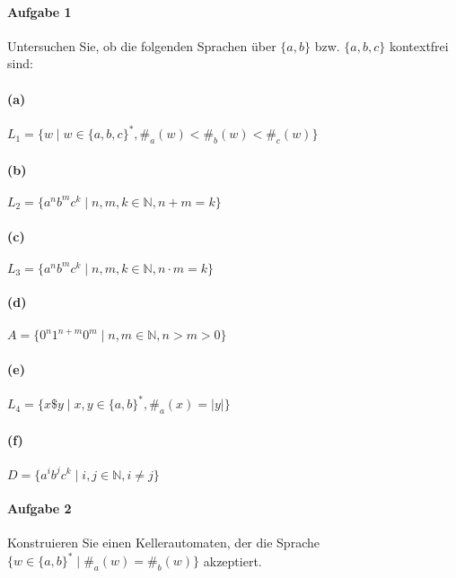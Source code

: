 \documentclass[titlepage]{article}
\renewcommand{\]}{\right]}
\renewcommand{\[}{\left[}
\renewcommand{\)}{\right)}
\renewcommand{\(}{\left(}
\renewcommand{\|}{\;|\;}
\begin{document}
\begingroup\let\clearpage\relax
	
	
	\paragraph{Aufgabe 1} Untersuchen Sie, ob die folgenden Sprachen über $\{a,b\}$ bzw. $\{a,b,c\}$ kontextfrei sind:
		\paragraph{(a)} $L_1=\{w\mid w\in\{a,b,c\}^*,\#_a(w)<\#_b(w)<\#_c(w)\}$
		
		\paragraph{(b)}  $L_2=\{a^nb^mc^k\mid n,m,k\in\mathbb{N},n+m=k\}$
		 
		\paragraph{(c)} $L_3=\{a^nb^mc^k\mid n,m,k\in\mathbb{N},n\cdot m=k\}$
		 
		\paragraph{(d)} $A=\{0^n1^{n+m}0^m\mid n,m\in\mathbb{N},n>m>0\}$
		 
		\paragraph{(e)} $L_4=\{x\$y\mid x,y\in\{a,b\}^*,\#_a(x)=\mid y\mid\}$
		
		\paragraph{(f)} $D=\{a^ib^jc^k\mid i,j\in\mathbb{N},i\neq j\}$
		
	
	\paragraph{Aufgabe 2} Konstruieren Sie einen Kellerautomaten, der die Sprache $\{w\in\{a,b\}^*\mid\#_a(w)=\#_b(w)\}$ akzeptiert.
	
	
	\endgroup
\end{document}

